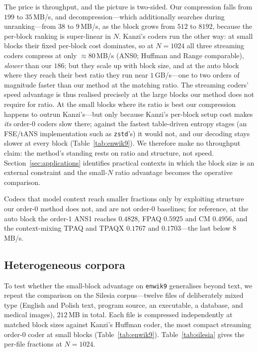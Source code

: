 \documentclass[entropy,article,submit,oneauthor,pdftex]{Definitions/mdpi}
\begin{document}
The price is throughput, and the picture is two-sided. Our compression falls from
$199$ to $35$\,MB/s, and decompression---which additionally searches during
unranking---from $38$ to $9$\,MB/s, as the block grows from $512$ to $8192$,
because the per-block ranking is super-linear in $N$. Kanzi's coders run the
other way: at small blocks their fixed per-block cost dominates, so at $N=1024$
all three streaming coders compress at only ${\approx}80$\,MB/s (ANS0; Huffman and
Range comparable), \emph{slower} than our $186$; but they scale
up with block size, and at the auto block where they reach their best ratio they
run near $1$\,GB/s---one to two orders of magnitude faster than our method at the
matching ratio. The streaming coders' speed advantage is thus realised precisely
at the large blocks our method does not require for ratio. At the small blocks where its
ratio is best our compression happens to outrun Kanzi's---but only because Kanzi's per-block
setup cost makes \emph{its} order-$0$ coders slow there; against the fastest table-driven
entropy stages (an FSE/tANS implementation such as \texttt{zstd}'s) it would not, and our
decoding stays slower at every block (Table~\ref{tab:enwik9}). We therefore make no
throughput claim: the method's standing rests on ratio and structure, not speed.
Section~\ref{sec:applications} identifies practical contexts in which the block
size is an external constraint and the small-$N$ ratio advantage becomes the
operative comparison.

Codecs that model context reach smaller fractions only by exploiting structure
our order-$0$ method does not, and are not order-$0$ baselines; for reference, at the auto
block the order-$1$ ANS1 reaches $0.4828$, FPAQ $0.5925$ and CM $0.4956$, and the
context-mixing TPAQ and TPAQX $0.1767$ and $0.1703$---the last below $8$\,MB/s.

\subsection{Heterogeneous corpora}\label{sec:silesia}
To test whether the small-block advantage on \texttt{enwik9} generalises beyond
text, we repeat the comparison on the Silesia corpus---twelve files of
deliberately mixed type (English and Polish text, program source, an executable, a
database, and medical images), $212$\,MB in total. Each file is compressed
independently at matched block sizes against Kanzi's Huffman coder, the most
compact streaming order-$0$ coder at small blocks (Table~\ref{tab:enwik9}).
Table~\ref{tab:silesia} gives the per-file fractions at $N=1024$.
\end{document}
